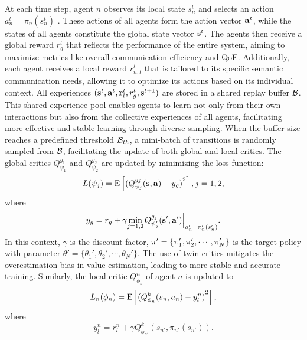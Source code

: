 \documentclass[10pt, lettersize,journal]{IEEEtran}
\begin{document}
	At each time step, agent $n$ observes its local state $s_n^t$ and selects an action $a_n^t = {\pi _n}(s_n^t)$ . These actions of all agents form the action vector ${{\bf{a}}^t}$, while the states of all agents constitute the global state vector ${{\bf{s}}^t}$. The agents then receive a global reward $r_g^t$ that reflects the performance of the entire system, aiming to maximize metrics like overall communication efficiency and QoE. Additionally, each agent receives a local reward $r_{n,l}^t$ that is tailored to its specific semantic communication needs, allowing it to optimize its actions based on its individual context. All experiences $({{\bf{s}}^t},{{\bf{a}}^t},{\bf{r}}_l^t,r_g^t,{{\bf{s}}^{t + 1}})$ are stored in a shared replay buffer ${\cal B}$. This shared experience pool enables agents to learn not only from their own interactions but also from the collective experiences of all agents, facilitating more effective and stable learning through diverse sampling. When the buffer size reaches a predefined threshold ${{\cal B}_{th}}$, a mini-batch of transitions is randomly sampled from ${\cal B}$, facilitating the update of both global and local critics.
	The global critics $Q_{{\psi _1}}^{{g_1}}$ and $Q_{{\psi _2}}^{{g_2}}$ are updated by minimizing the loss function:
	\begin{equation}\label{eq18}
		L({\psi _j}) = {\rm{E}}\left[ {{{(Q_{{\psi _j}}^{{g_j}}({\bf{s}},{\bf{a}}) - {y_g})}^2}} \right],j = 1,2,
	\end{equation}
	where 
	\begin{equation}\label{eq19}
		{y_g} = {r_g} + \gamma {\mathop {\min }\limits_{j = 1,2}}{\left. {Q_{\psi _j'}^{{g_j}}({\bf{s',a'}})} \right|_{a_n' = \pi _n'(s_n')}}.
	\end{equation}
	In this context, $\gamma$ is the discount factor, ${\bf{\pi}}' = \{ \pi _1',\pi _2', \cdots ,\pi _N'\}$ is the target policy with parameter $\theta ' = \{ \theta _1',\theta _2', \cdots ,\theta _N'\}$. The use of twin critics mitigates the overestimation bias in value estimation, leading to more stable and accurate training.
	Similarly, the local critic $Q_{{\phi _n}}^n$ of agent $n$ is updated to 
	\begin{equation}\label{eq20}
		{L_n}({\phi _n}) = {\rm{E}}\left[ {{{(Q_{{\phi _n}}^k({s_n},{a_n}) - y_l^n)}^2}} \right],
	\end{equation}
	where\begin{equation}\label{eq1}
		y_l^n = r_l^n + \gamma Q_{{\phi _{n'}}}^k({s_{n'}},{\pi _{n'}}({s_{n'}})).
	\end{equation}
	
\end{document}
